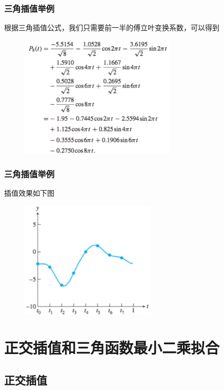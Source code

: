 \documentclass[10pt]{beamer}
\begin{document}
\begin{frame}
\frametitle{三角插值举例}
根据三角插值公式，我们只需要前一半的傅立叶变换系数，可以得到
\begin{figure}
\includegraphics[width=7.5cm]{figs/10-2-1_DFT_Interp-3} 
\end{figure}
\end{frame}



\begin{frame}
\frametitle{三角插值举例}
插值效果如下图
\begin{figure}
\includegraphics[width=6.5cm]{figs/10-2-1_DFT_Interp-4} 
\end{figure}
\end{frame}




\section{正交插值和三角函数最小二乘拟合}

\subsection{正交插值}
\end{document}
